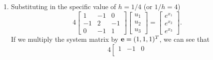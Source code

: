 {\begin{solution}
\begin{enumerate}
\begin{eqnarray*}
\frac{-u_{3} + 2u_2 - u_{1}}{h^2} =  f(x_2)\\
\frac{-u_{4} + 2u_3 - u_{2}}{h^2} =  f(x_3).
\end{eqnarray*}
This reduces to
\begin{eqnarray*}
\frac{-u_{2} + u_1 }{h^2} =  f(x_1)\\
\frac{-u_{3} + 2u_2 - u(x_{1})}{h^2} =  f(x_2)\\
\frac{u_3 - u_{2}}{h^2} =  f(x_3).
\end{eqnarray*}
The corresponding matrix system can be written
\[
\frac{1}{h^2}\left[\begin{array}{ccc}
              1 & -1&0 \\
               -1 & 2 &  -1  \\
                 0 &   -1  & 1 
               \end{array}\right]
               \left[\begin{array}{c}
               u_1\\u_2\\u_3
               \end{array}\right] = 
                              \left[\begin{array}{c}
               f(x_1)\\f(x_2)\\f(x_3) 
               \end{array}\right].
\]
\item Substituting in the specific value of $h = 1/4$ (or $1/h = 4$)
\[
4\left[\begin{array}{ccc}
              1 & -1&0 \\
               -1 & 2 &  -1  \\
                 0 &   -1  & 1 
               \end{array}\right]
               \left[\begin{array}{c}
               u_1\\u_2\\u_3
               \end{array}\right] = 
                              \left[\begin{array}{c}
               e^{x_1}\\e^{x_2}\\e^{x_3}
               \end{array}\right].
\]
If we multiply the system matrix by ${\bf e} = (1,1,1)^T$, we can see that 
\[
4\left[\begin{array}{ccc}
              1 & -1&0 \\

\end{array}\]
\end{enumerate}
\end{solution}}
